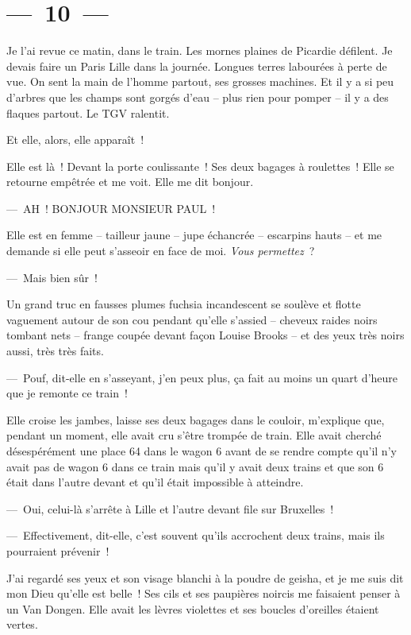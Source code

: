 \documentclass[twoside]{book} %
\begin{document}
\section[{— 10 —}]{— 10 —}
\renewcommand{\leftmark}{— 10 —}

\noindent Je l’ai revue ce matin, dans le train. Les mornes plaines de Picardie défilent. Je devais faire un Paris Lille dans la journée. Longues terres labourées à perte de vue. On sent la main de l’homme partout, ses grosses machines. Et il y a si peu d’arbres que les champs sont gorgés d’eau – plus rien pour pomper – il y a des flaques partout. Le TGV ralentit.\par
Et elle, alors, elle apparaît !\par
Elle est là ! Devant la porte coulissante ! Ses deux bagages à roulettes ! Elle se retourne empêtrée et me voit. Elle me dit bonjour.\par
— AH ! BONJOUR MONSIEUR PAUL !\par
Elle est en femme – tailleur jaune – jupe échancrée – escarpins hauts – et me demande si elle peut s’asseoir en face de moi. \emph{Vous permettez} ?\par
— Mais bien sûr !\par
Un grand truc en fausses plumes fuchsia incandescent se soulève et flotte vaguement autour de son cou pendant qu’elle s’assied – cheveux raides noirs tombant nets – frange coupée devant façon Louise Brooks – et des yeux très noirs aussi, très très faits.\par
— Pouf, dit-elle en s’asseyant, j’en peux plus, ça fait au moins un quart d’heure que je remonte ce train !\par
Elle croise les jambes, laisse ses deux bagages dans le couloir, m’explique que, pendant un moment, elle avait cru s’être trompée de train. Elle avait cherché désespérément une place 64 dans le wagon 6 avant de se rendre compte qu’il n’y avait pas de wagon 6 dans ce train mais qu’il y avait deux trains et que son 6 était dans l’autre devant et qu’il était impossible à atteindre.\par
— Oui, celui-là s’arrête à Lille et l’autre devant file sur Bruxelles !\par
— Effectivement, dit-elle, c’est souvent qu’ils accrochent deux trains, mais ils pourraient prévenir !\par
J’ai regardé ses yeux et son visage blanchi à la poudre de geisha, et je me suis dit mon Dieu qu’elle est belle ! Ses cils et ses paupières noircis me faisaient penser à un Van Dongen. Elle avait les lèvres violettes et ses boucles d’oreilles étaient vertes.\par
\end{document}
